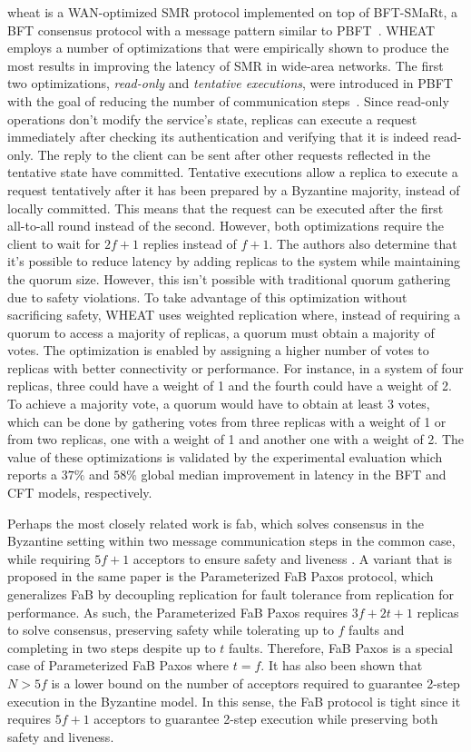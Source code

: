 \acrfull{wheat} is a WAN-optimized SMR protocol implemented on top of BFT-SMaRt, a BFT consensus protocol with a message pattern similar to PBFT~\cite{Sousa2016,Bessani:2014}. WHEAT employs a number of optimizations that were empirically shown to produce the most results in improving the latency of SMR in wide-area networks. The first two optimizations, \textit{read-only} and \textit{tentative executions}, were introduced in PBFT with the goal of reducing the number of communication steps~\cite{Castro1999}. Since read-only operations don't modify the service's state, replicas can execute a request immediately after checking its authentication and verifying that it is indeed read-only. The reply to the client can be sent after other requests reflected in the tentative state have committed. Tentative executions allow a replica to execute a request tentatively after it has been prepared by a Byzantine majority, instead of locally committed. This means that the request can be executed after the first all-to-all round instead of the second. However, both optimizations require the client to wait for $2f+1$ replies instead of $f+1$. The authors also determine that it's possible to reduce latency by adding replicas to the system while maintaining the quorum size. However, this isn't possible with traditional quorum gathering due to safety violations. To take advantage of this optimization without sacrificing safety, WHEAT uses weighted replication where, instead of requiring a quorum to access a majority of replicas, a quorum must obtain a majority of votes. The optimization is enabled by assigning a higher number of votes to replicas with better connectivity or performance. For instance, in a system of four replicas, three could have a weight of 1 and the fourth could have a weight of 2. To achieve a majority vote, a quorum would have to obtain at least 3 votes, which can be done by gathering votes from three replicas with a weight of 1 or from two replicas, one with a weight of 1 and another one with a weight of 2. The value of these optimizations is validated by the experimental evaluation which reports a $37\%$ and $58\%$ global median improvement in latency in the BFT and CFT models, respectively. \par
Perhaps the most closely related work is \acrfull{fab}, which solves consensus in the Byzantine setting within two message communication steps in the common case, while requiring $5f+1$ acceptors to ensure safety and liveness \cite{Martin2006}. A variant that is proposed in the same paper is the Parameterized FaB Paxos protocol, which generalizes FaB by decoupling replication for fault tolerance from replication for performance. As such, the Parameterized FaB Paxos requires $3f+2t+1$ replicas to solve consensus, preserving safety while tolerating up to $f$ faults and completing in two steps despite up to $t$ faults. Therefore, FaB Paxos is a special case of Parameterized FaB Paxos where $t=f$. It has also been shown that $N>5f$ is a lower bound on the number of acceptors required to guarantee 2-step execution in the Byzantine model. In this sense, the FaB protocol is tight since it requires $5f+1$ acceptors to guarantee 2-step execution while preserving both safety and liveness. \par

